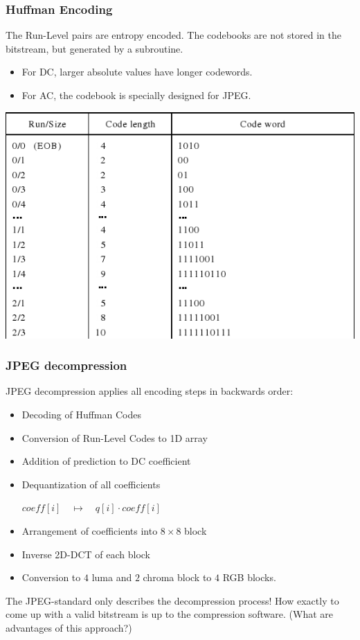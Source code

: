 \documentclass{beamer}
\begin{document}
\begin{frame}
\frametitle{Huffman Encoding}
The Run-Level pairs are entropy encoded. The codebooks are not stored in the bitstream,
but generated by a subroutine.

\begin{itemize}
\item For DC, larger absolute values have longer codewords.

\item For AC, the codebook is specially designed for JPEG. 
\end{itemize}
\begin{center}
\includegraphics[height=.5\textwidth]{codes.png}
\end{center}
\end{frame}


\begin{frame}
\frametitle{JPEG decompression}
JPEG decompression applies all encoding steps in backwards order:

\begin{itemize}
\item Decoding of Huffman Codes
\item Conversion of Run-Level Codes to 1D array
\item Addition of prediction to DC coefficient
\item Dequantization of all coefficients 

$\mathit{coeff}[i] \quad\mapsto\quad \mathit{q}[i]\cdot \mathit{coeff}[i]$ 

\item Arrangement of coefficients into $8\times 8$ block
\item Inverse 2D-DCT of each block
\item Conversion to $4$ luma and $2$ chroma block to $4$ RGB blocks.
\end{itemize}

{The JPEG-standard only describes the decompression process!} 
How exactly to come up with a valid bitstream is up to the compression
software. (What are advantages of this approach?)
\end{frame}
\end{document}
